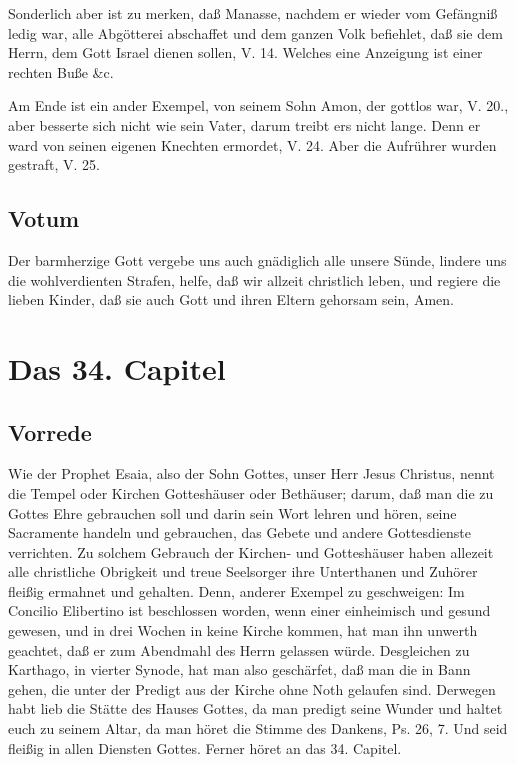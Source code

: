 Sonderlich aber ist zu merken, daß Manasse, nachdem er wieder vom Gefängniß ledig war, alle Abgötterei abschaffet und dem ganzen Volk befiehlet, daß sie dem Herrn, dem Gott Israel dienen sollen, V. 14. Welches eine Anzeigung ist einer rechten Buße \&c.

Am Ende ist ein ander Exempel, von seinem Sohn Amon, der gottlos war, V. 20., aber besserte sich nicht wie sein Vater, darum treibt ers nicht lange. Denn er ward von seinen eigenen Knechten ermordet, V. 24. Aber die Aufrührer wurden gestraft, V. 25.

\section{Votum}

Der barmherzige Gott vergebe uns auch gnädiglich alle unsere Sünde, lindere uns die wohlverdienten Strafen, helfe, daß wir allzeit christlich leben, und regiere die lieben Kinder, daß sie auch Gott und ihren Eltern gehorsam sein, Amen.

\chapter{Das 34. Capitel}

\section{Vorrede}

Wie der Prophet Esaia, also der Sohn Gottes, unser Herr Jesus Christus, nennt die Tempel oder Kirchen Gotteshäuser oder Bethäuser; darum, daß man die zu Gottes Ehre gebrauchen soll und darin sein Wort lehren und hören, seine Sacramente handeln und gebrauchen, das Gebete und andere Gottesdienste verrichten. Zu solchem Gebrauch der Kirchen- und Gotteshäuser haben allezeit alle christliche Obrigkeit und treue Seelsorger ihre Unterthanen und Zuhörer fleißig ermahnet und gehalten. Denn, anderer Exempel zu geschweigen: Im Concilio Elibertino ist beschlossen worden, wenn einer einheimisch und gesund gewesen, und in drei Wochen in keine Kirche kommen, hat man ihn unwerth geachtet, daß er zum Abendmahl des Herrn gelassen würde. Desgleichen zu Karthago, in vierter Synode, hat man also geschärfet, daß man die in Bann gehen, die unter der Predigt aus der Kirche ohne Noth gelaufen sind. Derwegen habt lieb die Stätte des Hauses Gottes, da man predigt seine Wunder und haltet euch zu seinem Altar, da man höret die Stimme des Dankens, Ps. 26, 7. Und seid fleißig in allen Diensten Gottes. Ferner höret an das 34. Capitel.

